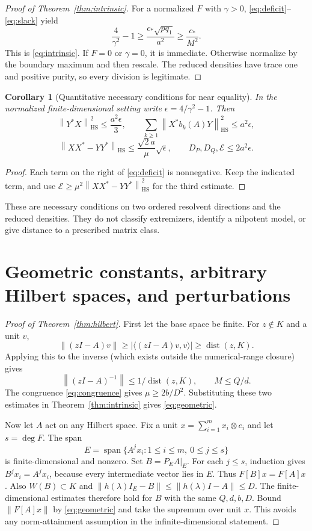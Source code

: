 \documentclass[11pt]{article}
\newtheorem{corollary}[theorem]{Corollary}
\theoremstyle{remark}\newtheorem{remark}[theorem]{Remark}
\newcommand{\HS}{\mathrm{HS}}
\newcommand{\dist}{\operatorname{dist}}
\newcommand{\norm}[1]{\left\lVert #1\right\rVert}
\begin{document}
\begin{proof}[Proof of Theorem~\ref{thm:intrinsic}]
For a normalized $F$ with $\gamma>0$, \eqref{eq:deficit}--\eqref{eq:slack} yield
\[\frac4{\gamma^2}-1\ge \frac{c_*\sqrt{p q_1}}{a^2}\ge\frac{c_*}{M^2}.
\]
This is \eqref{eq:intrinsic}. If $F=0$ or $\gamma=0$, it is immediate. Otherwise normalize by the boundary maximum and then rescale. The reduced densities have trace one and positive purity, so every division is legitimate.
\end{proof}

\begin{corollary}[Quantitative necessary conditions for near equality]\label{cor:near}
In the normalized finite-dimensional setting write $\epsilon=4/\gamma^2-1$. Then
\[\norm{Y^*X}_\HS^2\le\frac{a^2\epsilon}{3},\qquad
\sum_{k\ge1}\norm{X^*b_k(A)Y}_\HS^2\le a^2\epsilon,
\]
\[\norm{XX^*-YY^*}_\HS\le\frac{\sqrt2a}{\mu}\sqrt\epsilon,\qquad
D_P,D_Q,\mathcal E\le2a^2\epsilon.
\]
\end{corollary}
\begin{proof}
Each term on the right of \eqref{eq:deficit} is nonnegative. Keep the indicated term, and use $\mathcal E\ge\mu^2\norm{XX^*-YY^*}_\HS^2$ for the third estimate.
\end{proof}
These are necessary conditions on two ordered resolvent directions and the reduced densities. They do not classify extremizers, identify a nilpotent model, or give distance to a prescribed matrix class.

\section{Geometric constants, arbitrary Hilbert spaces, and perturbations}
\begin{proof}[Proof of Theorem~\ref{thm:hilbert}]
First let the base space be finite. For $z\notin K$ and a unit $v$,
\[\norm{(zI-A)v}\ge|\langle(zI-A)v,v\rangle|\ge\dist(z,K).
\]
Applying this to the inverse (which exists outside the numerical-range closure) gives
\[\norm{(zI-A)^{-1}}\le1/\dist(z,K),\qquad M\le Q/d.\]
The congruence \eqref{eq:congruence} gives $\mu\ge2b/D^2$. Substituting these two estimates in Theorem~\ref{thm:intrinsic} gives \eqref{eq:geometric}.

Now let $A$ act on any Hilbert space. Fix a unit $x=\sum_{i=1}^m x_i\otimes e_i$ and let $s=\deg F$. The span
\[E=\operatorname{span}\{A^j x_i:1\le i\le m,\ 0\le j\le s\}
\]
is finite-dimensional and nonzero. Set $B=P_EA|_E$. For each $j\le s$, induction gives $B^jx_i=A^jx_i$, because every intermediate vector lies in $E$. Thus $F[B]x=F[A]x$. Also $W(B)\subset K$ and
$\norm{h(\lambda)I_E-B}\le\norm{h(\lambda)I-A}\le D$.
The finite-dimensional estimates therefore hold for $B$ with the same $Q,d,b,D$. Bound $\norm{F[A]x}$ by \eqref{eq:geometric} and take the supremum over unit $x$. This avoids any norm-attainment assumption in the infinite-dimensional statement.
\end{proof}
\end{document}
